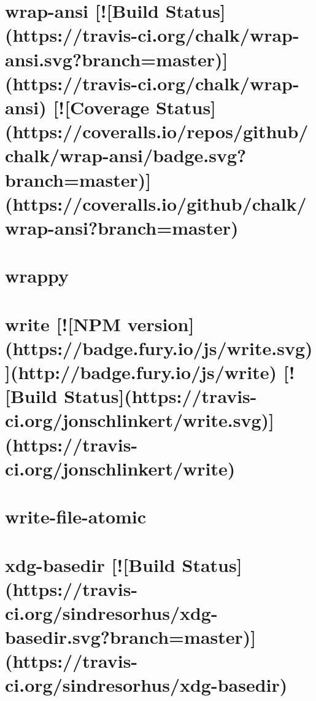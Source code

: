 \documentclass[twoside]{book}
\newcommand{\+}{\discretionary{\mbox{\scriptsize$\hookleftarrow$}}{}{}}
\begin{document}
\chapter{wrap-\/ansi \mbox{[}!\mbox{[}Build Status\mbox{]}(https\+://travis-\/ci.org/chalk/wrap-\/ansi.svg?branch=master)\mbox{]}(https\+://travis-\/ci.org/chalk/wrap-\/ansi) \mbox{[}!\mbox{[}Coverage Status\mbox{]}(https\+://coveralls.io/repos/github/chalk/wrap-\/ansi/badge.svg?branch=master)\mbox{]}(https\+://coveralls.io/github/chalk/wrap-\/ansi?branch=master)}
\label{md__c_1_workspace_demo_src_main_script_node_modules_wrap-ansi_readme}

\chapter{wrappy}
\label{md__c_1_workspace_demo_src_main_script_node_modules_wrappy__r_e_a_d_m_e}

\chapter{write \mbox{[}!\mbox{[}N\+PM version\mbox{]}(https\+://badge.fury.\+io/js/write.svg)\mbox{]}(http\+://badge.fury.\+io/js/write) \mbox{[}!\mbox{[}Build Status\mbox{]}(https\+://travis-\/ci.org/jonschlinkert/write.svg)\mbox{]}(https\+://travis-\/ci.org/jonschlinkert/write)}
\label{md__c_1_workspace_demo_src_main_script_node_modules_write__r_e_a_d_m_e}

\chapter{write-\/file-\/atomic}
\label{md__c_1_workspace_demo_src_main_script_node_modules_write-file-atomic__r_e_a_d_m_e}

\chapter{xdg-\/basedir \mbox{[}!\mbox{[}Build Status\mbox{]}(https\+://travis-\/ci.org/sindresorhus/xdg-\/basedir.svg?branch=master)\mbox{]}(https\+://travis-\/ci.org/sindresorhus/xdg-\/basedir)}
\label{md__c_1_workspace_demo_src_main_script_node_modules_xdg-basedir_readme}

\end{document}
